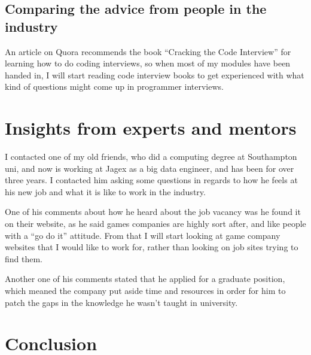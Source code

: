\documentclass{scrartcl}
\begin{document}
\subsection{Comparing the advice from people in the industry}
An article on Quora \cite{codeBookreview} recommends the book ``Cracking the Code Interview'' for learning how to do coding interviews, so when most of my modules have been handed in, I will start reading code interview books to get experienced with what kind of questions might come up in programmer interviews.





\section{Insights from experts and mentors}

I contacted one of my old friends, who did a computing degree at Southampton uni, and now is working at Jagex as a big data engineer, and has been for over three years. 
I contacted him asking some questions in regards to how he feels at his new job and what it is like to work in the industry.

One of his comments about how he heard about the job vacancy was he found it on their website, as he said games companies are highly sort after, and like people with a ``go do it'' attitude.
From that I will start looking at game company websites that I would like to work for, rather than looking on job sites trying to find them.

Another one of his comments stated that he applied for a graduate position, which meaned the company put aside time and resources in order for him to patch the gaps in the knowledge he wasn't taught in university.



\section{Conclusion}
\end{document}
